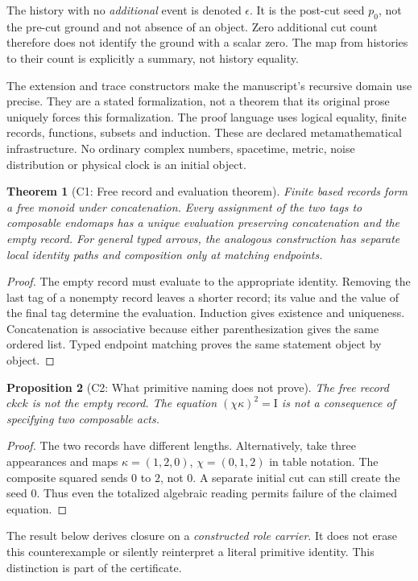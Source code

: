 \documentclass[11pt]{article}
\newtheorem{theorem}{Theorem}[section]
\newtheorem{proposition}[theorem]{Proposition}
\newcommand{\Id}{\mathrm I}
\newcommand{\cut}{\kappa}
\newcommand{\selfcut}{\chi}
\begin{document}
The history with no \emph{additional} event is denoted $\epsilon$.
It is the post-cut seed $p_0$, not the pre-cut ground and not absence of an
object. Zero additional cut count therefore does not identify the ground
with a scalar zero. The map from histories to their count is explicitly a
summary, not history equality.

The extension and trace constructors make the manuscript's recursive domain
use precise. They are a stated formalization, not a theorem that its original
prose uniquely forces this formalization. The proof language uses logical
equality, finite records, functions, subsets and induction. These are declared
metamathematical infrastructure. No ordinary complex numbers, spacetime,
metric, noise distribution or physical clock is an initial object.

\begin{theorem}[C1: Free record and evaluation theorem]
\label{thm:free}
Finite based records form a free monoid under concatenation. Every assignment
of the two tags to composable endomaps has a unique evaluation preserving
concatenation and the empty record. For general typed arrows, the analogous
construction has separate local identity paths and composition only at
matching endpoints.
\end{theorem}
\begin{proof}
The empty record must evaluate to the appropriate identity. Removing the last
tag of a nonempty record leaves a shorter record; its value and the value of
the final tag determine the evaluation. Induction gives existence and
uniqueness. Concatenation is associative because either parenthesization gives
the same ordered list. Typed endpoint matching proves the same statement
object by object.
\end{proof}

\begin{proposition}[C2: What primitive naming does not prove]
\label{thm:gap}
The free record $ckck$ is not the empty record. The equation
$(\selfcut\cut)^2=\Id$ is not a consequence of specifying two composable acts.
\end{proposition}
\begin{proof}
The two records have different lengths. Alternatively, take three appearances
and maps $\cut=(1,2,0)$, $\selfcut=(0,1,2)$ in table notation. The composite
squared sends $0$ to $2$, not $0$. A separate initial cut can still create
the seed $0$. Thus even the totalized algebraic reading permits failure of
the claimed equation.
\end{proof}
The result below derives closure on a \emph{constructed role carrier}. It does
not erase this counterexample or silently reinterpret a literal primitive
identity. This distinction is part of the certificate.
\end{document}
